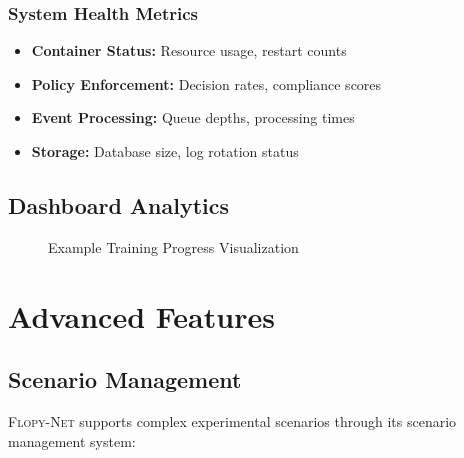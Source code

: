 \documentclass[12pt,a4paper,twoside]{article}
\newcommand{\flopynet}{\textsc{Flopy-Net}}
\begin{document}
\subsubsection{System Health Metrics}

\begin{itemize}
    \item \textbf{Container Status:} Resource usage, restart counts
    \item \textbf{Policy Enforcement:} Decision rates, compliance scores
    \item \textbf{Event Processing:} Queue depths, processing times
    \item \textbf{Storage:} Database size, log rotation status
\end{itemize}

\subsection{Dashboard Analytics}

\begin{figure}[H]
\centering
{}
\caption{Example Training Progress Visualization}
\label{fig:training-progress}
\end{figure}

\section{Advanced Features}

\subsection{Scenario Management}

\flopynet{} supports complex experimental scenarios through its scenario management system:
\end{document}
